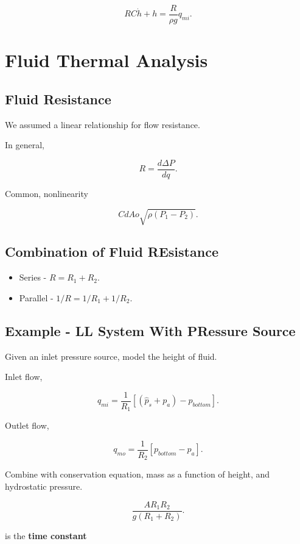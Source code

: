 \documentclass[12pt, a4paper]{report}
\begin{document}
  \[
      RC\dot h + h = \frac{R}{\rho g}q_{mi}
    .\]




  \chapter{Fluid Thermal Analysis}

  \section{Fluid Resistance}

  We assumed a linear relationship for flow resistance.

  In general,

  \[
      R = \frac{d\Delta P}{dq}
    .\]

  Common, nonlinearity

  \[
      CdAo\sqrt{\rho(P_1 - P_2)}
    .\]

  \section{Combination of Fluid REsistance}

  \begin{itemize}
    \item Series - $ R = R_1 + R_2. $
    \item Parallel - $ 1/R = 1/R_1 + 1/R_2. $
  \end{itemize}

  \newpage

  \section{Example - LL System With PRessure Source}

  Given an inlet pressure source, model the height of fluid.

  Inlet flow,

  \[
      q_{mi} = \frac{1}{R_1} \left[ (\hat p_s + p_a) - p_{bottom} \right]
    .\]

  Outlet flow,

  \[
      q_{mo} = \frac{1}{R_2}[p_{bottom} - p_a]
    .\]

  Combine with conservation equation, mass as a function of height, and hydrostatic pressure.

  \[
      \frac{AR_1R_2}{g (R_1 + R_2)}
    .\]

  is the \textbf{time constant}
\end{document}
